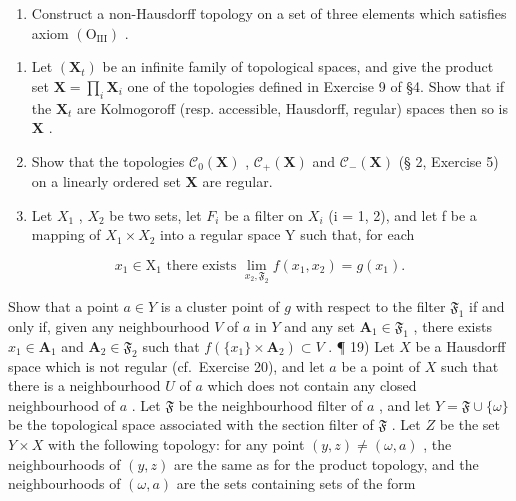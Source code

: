 \begin{enumerate}
\def\labelenumi{\alph{enumi})}
\setcounter{enumi}{1}
\tightlist
\item
  Construct a non-Hausdorff topology on a set of three elements which satisfies axiom \((\mathrm{O}_{\mathrm{III}})\) .
\end{enumerate}

\begin{enumerate}
\def\labelenumi{\arabic{enumi})}
\setcounter{enumi}{15}
\item
  Let \((\mathbf{X}_t)\) be an infinite family of topological spaces, and give the product set \(\mathbf{X} = \prod_{i} \mathbf{X}_i\) one of the topologies defined in Exercise 9 of §4. Show that if the \(\mathbf{X}_t\) are Kolmogoroff (resp. accessible, Hausdorff, regular) spaces then so is \(\mathbf{X}\) .
\item
  Show that the topologies \(\mathcal{C}_0(\mathbf{X})\) , \(\mathcal{C}_+(\mathbf{X})\) and \(\mathcal{C}_{-}(\mathbf{X})\) (§ 2, Exercise 5) on a linearly ordered set \(\mathbf{X}\) are regular.
\item
  Let \(X_{1}\) , \(X_{2}\) be two sets, let \(F_{i}\) be a filter on \(X_{i}\) (i = 1, 2), and let f be a mapping of \(X_{1} \times X_{2}\) into a regular space Y such that, for each
\end{enumerate}

\[
x _ {1} \in \mathrm{X} _ {1} \text { there   exists } \lim _ {x _ {2}, \mathfrak {F} _ {2}} f (x _ {1}, x _ {2}) = g (x _ {1}).
\]

Show that a point \(a \in Y\) is a cluster point of \(g\) with respect to the filter \(\mathfrak{F}_1\) if and only if, given any neighbourhood \(V\) of \(a\) in \(Y\) and any set \(\mathbf{A}_1 \in \mathfrak{F}_1\) , there exists \(x_1 \in \mathbf{A}_1\) and \(\mathbf{A}_2 \in \mathfrak{F}_2\) such that \(f(\{x_1\} \times \mathbf{A}_2) \subset V\) . ¶ 19) Let \(X\) be a Hausdorff space which is not regular (cf.~Exercise 20), and let \(a\) be a point of \(X\) such that there is a neighbourhood \(U\) of \(a\) which does not contain any closed neighbourhood of \(a\) . Let \(\mathfrak{F}\) be the neighbourhood filter of \(a\) , and let \(Y = \mathfrak{F} \cup \{\omega\}\) be the topological space associated with the section filter of \(\mathfrak{F}\) . Let \(Z\) be the set \(Y \times X\) with the following topology: for any point \((y, z) \neq (\omega, a)\) , the neighbourhoods of \((y, z)\) are the same as for the product topology, and the neighbourhoods of \((\omega, a)\) are the sets containing sets of the form

